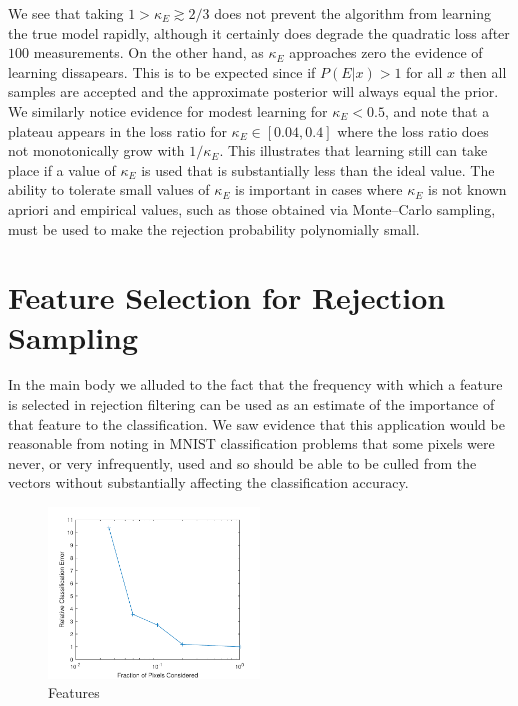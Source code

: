 \documentclass{article} %
\begin{document}
We see that taking $1>\kappa_E\gtrsim 2/3$ does not prevent the algorithm from learning the true model rapidly, although it certainly does
degrade the quadratic loss after $100$ measurements.  On the other hand, as $\kappa_E$ approaches zero the evidence of learning dissapears.  This is to be expected since if $P(E|x)>1$ for all $x$ then all samples are accepted and the approximate posterior will always equal the prior.  We similarly notice evidence for modest learning for $\kappa_E < 0.5$, and note that a plateau appears in the loss ratio for $\kappa_E \in [0.04,0.4]$ where the loss ratio does not monotonically grow with $1/\kappa_E$.  This illustrates that learning still can take place if a value of $\kappa_E$ is used that
is substantially less than the ideal value.  The ability to tolerate small values of $\kappa_E$ is important in cases where $\kappa_E$ is not known apriori and empirical values, such as those obtained via Monte--Carlo sampling, must be used to make the rejection probability polynomially small.

\section{Feature Selection for Rejection Sampling}
\label{app:features}

In the main body we alluded to the fact that the frequency with which a feature is selected in rejection filtering can be used as an
estimate of the importance of that feature to the classification.  We saw evidence that this application would be reasonable from
noting in MNIST classification problems that some pixels were never, or very infrequently, used and so should be able to be culled from the 
vectors without substantially affecting the classification accuracy.  

\begin{figure}[t!]
    \begin{center}
        \includegraphics[width=0.5\textwidth]{Feature.pdf}
    \end{center}
    \caption{\label{fig:Features}
Features
    }
\end{figure}
\end{document}
